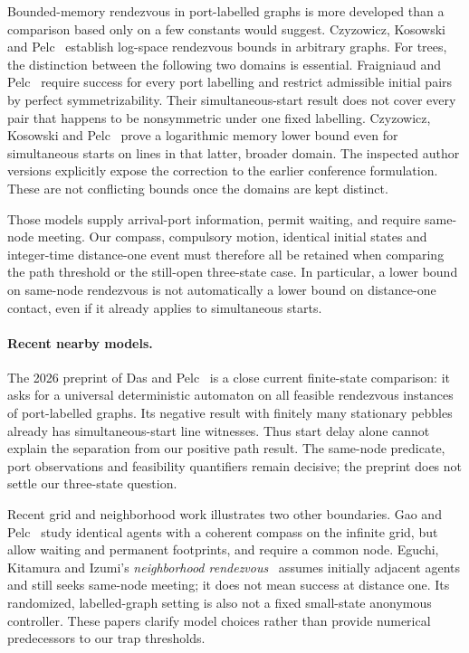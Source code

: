 Bounded-memory rendezvous in port-labelled graphs is more developed than a
comparison based only on a few constants would suggest. Czyzowicz, Kosowski and
Pelc~\cite{CzyzowiczEtAl2012} establish log-space rendezvous bounds in arbitrary
graphs. For trees, the distinction between the following two domains is essential.
Fraigniaud and Pelc~\cite[Definitions~1.1--1.2 and Section~1.2]{FraigniaudPelc2011}
require success for every port labelling and restrict admissible initial pairs by
perfect symmetrizability. Their simultaneous-start result does not cover every pair
that happens to be nonsymmetric under one fixed labelling. Czyzowicz, Kosowski and
Pelc~\cite{CzyzowiczEtAl2014} prove a logarithmic memory lower bound even for
simultaneous starts on lines in that latter, broader domain. The inspected author
versions explicitly expose the correction to the earlier conference formulation.
These are not conflicting bounds once the domains are kept distinct.

Those models supply arrival-port information, permit waiting, and require
same-node meeting. Our compass, compulsory motion, identical initial states and
integer-time distance-one event must therefore all be retained when comparing the
path threshold or the still-open three-state case. In particular, a lower bound on
same-node rendezvous is not automatically a lower bound on distance-one contact,
even if it already applies to simultaneous starts.

\paragraph{Recent nearby models.}
The 2026 preprint of Das and Pelc~\cite{DasPelc2026} is a close current finite-state
comparison: it asks for a universal deterministic automaton on all feasible
rendezvous instances of port-labelled graphs. Its negative result with finitely
many stationary pebbles already has simultaneous-start line witnesses.
Thus start delay alone cannot explain the separation from our positive path
result. The same-node predicate, port observations and feasibility quantifiers
remain decisive; the preprint does not settle our three-state question.

Recent grid and neighborhood work illustrates two other boundaries.
Gao and Pelc~\cite{GaoPelc2025} study identical agents with a coherent compass on
the infinite grid, but allow waiting and permanent footprints, and require a common
node. Eguchi, Kitamura and Izumi's \emph{neighborhood rendezvous}~\cite{EguchiEtAl2022}
assumes initially adjacent agents and still seeks same-node meeting; it does not
mean success at distance one. Its randomized, labelled-graph setting is also not a
fixed small-state anonymous controller. These papers clarify model choices rather
than provide numerical predecessors to our trap thresholds.

